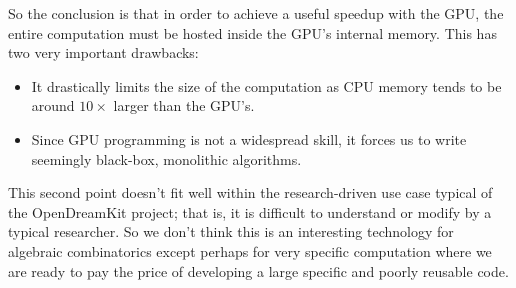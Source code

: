 \documentclass{deliverablereport}
\newcommand{\NN}{\mathbb{N}}
\begin{document}
So the conclusion is that in order to achieve a useful speedup with the GPU, the entire computation
must be hosted inside the GPU's internal memory. This has two very important drawbacks:
\begin{itemize}
\item It drastically limits the size of the computation as CPU memory tends to
  be around $10\times$ larger than the GPU's.
\item Since GPU programming is not a widespread skill, it forces us to write
  seemingly black-box, monolithic algorithms.
\end{itemize}
This second point doesn't fit well within the research-driven use case
typical of the OpenDreamKit project; that is, it is difficult to understand
or modify by a typical researcher. %
So we don't think this is an interesting
technology for algebraic combinatorics except perhaps for very specific
computation where we are ready to pay the price of developing a large
specific and poorly reusable code.






\end{document}
